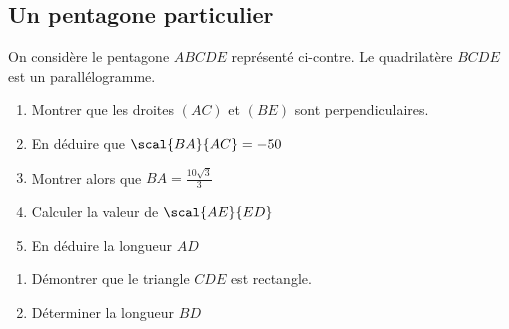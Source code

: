\documentclass[oneside,12pt]{book}          %
\begin{document}
\subsection{Un pentagone particulier}


\begin{minipage}{0.5\linewidth}
    On considère le pentagone $ABCDE$ représenté ci-contre. Le quadrilatère $BCDE$ est un parallélogramme.

    \begin{enumerate}
        \item Montrer que les droites $(AC)$ et $(BE)$ sont perpendiculaires.
        \item En déduire que $\scal{BA}{AC}=-50$
        \item Montrer alors que $BA=\frac{10\sqrt{3}}{3}$
        \item Calculer la valeur de $\scal{AE}{ED}$
        \item En déduire la longueur $AD$
    \end{enumerate}
\end{minipage}\hfill
\begin{minipage}{0.45\linewidth}
\end{minipage}

\vspace{-4mm}
\begin{enumerate}
	\item[6.] Démontrer que le triangle $CDE$ est rectangle.
    \item[7.] Déterminer la longueur $BD$
\end{enumerate}
\end{document}

